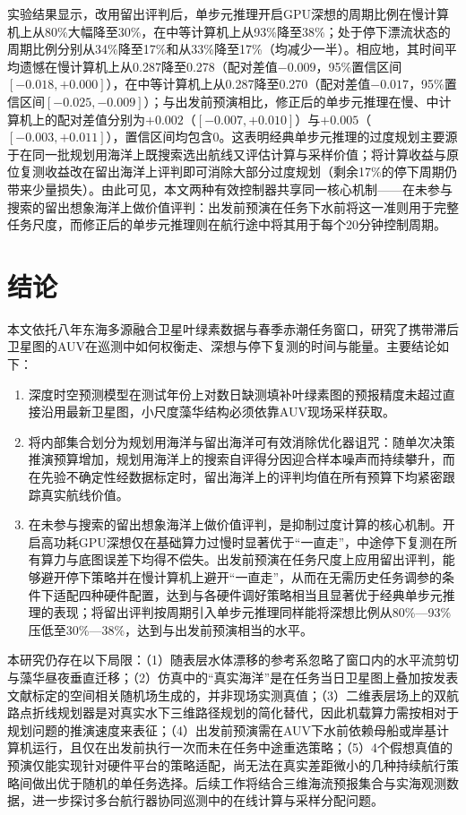 实验结果显示，改用留出评判后，单步元推理开启GPU深想的周期比例在慢计算机上从80\%大幅降至30\%，在中等计算机上从93\%降至38\%；处于停下漂流状态的周期比例分别从34\%降至17\%和从33\%降至17\%（均减少一半）。相应地，其时间平均遗憾在慢计算机上从0.287降至0.278（配对差值$-0.009$，95\%置信区间$[-0.018, +0.000]$），在中等计算机上从0.287降至0.270（配对差值$-0.017$，95\%置信区间$[-0.025, -0.009]$）；与出发前预演相比，修正后的单步元推理在慢、中计算机上的配对差值分别为$+0.002$（$[-0.007, +0.010]$）与$+0.005$（$[-0.003, +0.011]$），置信区间均包含0。这表明经典单步元推理的过度规划主要源于在同一批规划用海洋上既搜索选出航线又评估计算与采样价值；将计算收益与原位复测收益改在留出海洋上评判即可消除大部分过度规划（剩余17\%的停下周期仍带来少量损失）。由此可见，本文两种有效控制器共享同一核心机制——在未参与搜索的留出想象海洋上做价值评判：出发前预演在任务下水前将这一准则用于完整任务尺度，而修正后的单步元推理则在航行途中将其用于每个20分钟控制周期。

\section{结论}

本文依托八年东海多源融合卫星叶绿素数据与春季赤潮任务窗口，研究了携带滞后卫星图的AUV在巡测中如何权衡走、深想与停下复测的时间与能量。主要结论如下：
\begin{enumerate}
  \item 深度时空预测模型在测试年份上对数日缺测填补叶绿素图的预报精度未超过直接沿用最新卫星图，小尺度藻华结构必须依靠AUV现场采样获取。
  \item 将内部集合划分为规划用海洋与留出海洋可有效消除优化器诅咒：随单次决策推演预算增加，规划用海洋上的搜索自评得分因迎合样本噪声而持续攀升，而在先验不确定性经数据标定时，留出海洋上的评判均值在所有预算下均紧密跟踪真实航线价值。
  \item 在未参与搜索的留出想象海洋上做价值评判，是抑制过度计算的核心机制。开启高功耗GPU深想仅在基础算力过慢时显著优于“一直走”，中途停下复测在所有算力与底图误差下均得不偿失。出发前预演在任务尺度上应用留出评判，能够避开停下策略并在慢计算机上避开“一直走”，从而在无需历史任务调参的条件下适配四种硬件配置，达到与各硬件调好策略相当且显著优于经典单步元推理的表现；将留出评判按周期引入单步元推理同样能将深想比例从80\%—93\%压低至30\%—38\%，达到与出发前预演相当的水平。
\end{enumerate}

本研究仍存在以下局限：（1）随表层水体漂移的参考系忽略了窗口内的水平流剪切与藻华昼夜垂直迁移；（2）仿真中的“真实海洋”是在任务当日卫星图上叠加按发表文献标定的空间相关随机场生成的，并非现场实测真值；（3）二维表层场上的双航路点折线规划器是对真实水下三维路径规划的简化替代，因此机载算力需按相对于规划问题的推演速度来表征；（4）出发前预演需在AUV下水前依赖母船或岸基计算机运行，且仅在出发前执行一次而未在任务中途重选策略；（5）4个假想真值的预演仅能实现针对硬件平台的策略适配，尚无法在真实差距微小的几种持续航行策略间做出优于随机的单任务选择。后续工作将结合三维海流预报集合与实海观测数据，进一步探讨多台航行器协同巡测中的在线计算与采样分配问题。
